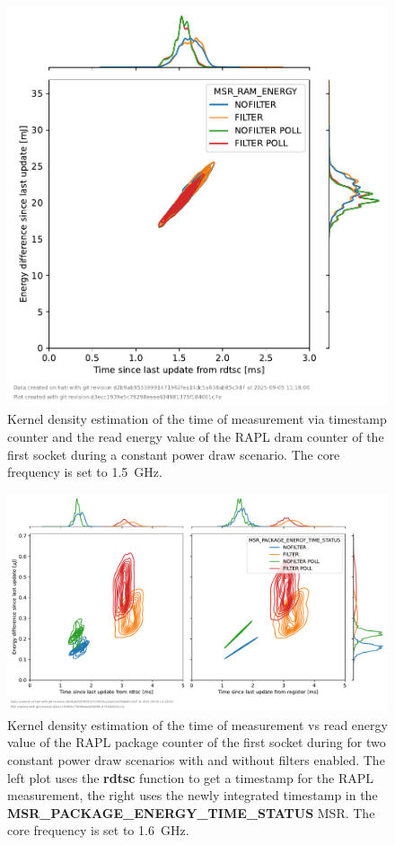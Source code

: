 \begin{figure}[]
    \centering
    \includegraphics[width=0.54\columnwidth]{fig/rapl-update-intervals/MSR_RAM_ENERGY_1500000.pdf}
    \caption{Kernel density estimation of the time of measurement via timestamp counter and the read energy value of the RAPL dram counter of the first socket during a constant power draw scenario.
    The core frequency is set to \SI{1.5}{\GHz}.}
\end{figure}

\clearpage
\begin{figure}[]
    \centering
    \includegraphics[width=\columnwidth]{fig/rapl-update-intervals/MSR_PACKAGE_ENERGY_TIME_STATUS_1600000.pdf}
    \caption{Kernel density estimation of the time of measurement vs read energy value of the RAPL package counter of the first socket during for two constant power draw scenarios with and without filters enabled.
    The left plot uses the \textbf{rdtsc} function to get a timestamp for the RAPL measurement, the right uses the newly integrated timestamp in the \textbf{MSR\_PACKAGE\_ENERGY\_TIME\_STATUS} MSR.
    The core frequency is set to \SI{1.6}{\GHz}.}
\end{figure}

